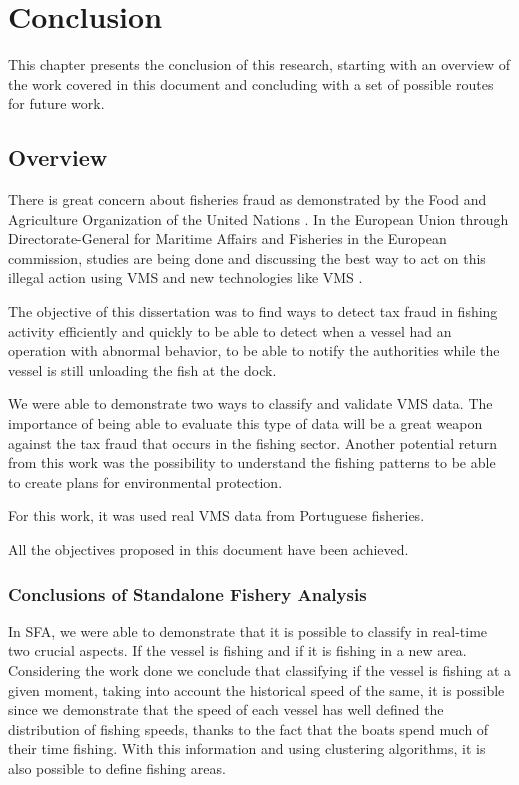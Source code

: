 % 
%  
%
\chapter{Conclusion}
\label{cha:conclusion}


This chapter presents the conclusion of this research, starting with an overview of the work covered in this document and concluding with a set of possible routes for future work.

\section{Overview} %
\label{sec:overview}

There is great concern about fisheries fraud as demonstrated by the Food and Agriculture Organization of the United Nations \cite{FAOFraud}.
In the European Union through Directorate-General for Maritime Affairs and Fisheries in the European commission, studies are being done and discussing the best way to act on this illegal action using VMS and new technologies like VMS \cite{WEBSITE:ECControl}.

The objective of this dissertation was to find ways to detect tax fraud in fishing activity efficiently and quickly to be able to detect when a vessel had an operation with abnormal behavior, to be able to notify the authorities while the vessel is still unloading the fish at the dock.

We were able to demonstrate two ways to classify and validate VMS data. The importance of being able to evaluate this type of data will be a great weapon against the tax fraud that occurs in the fishing sector. Another potential return from this work was the possibility to understand the fishing patterns to be able to create plans for environmental protection.

For this work, it was used real VMS data from Portuguese fisheries.

All the objectives proposed in this document have been achieved.

\subsection{Conclusions of Standalone Fishery Analysis} %
\label{sec:con_sfa}

In SFA, we were able to demonstrate that it is possible to classify in real-time two crucial aspects. If the vessel is fishing and if it is fishing in a new area.\\
Considering the work done we conclude that classifying if the vessel is fishing at a given moment, taking into account the historical speed of the same, it is possible since we demonstrate that the speed of each vessel has well defined the distribution of fishing speeds, thanks to the fact that the boats spend much of their time fishing.
With this information and using clustering algorithms, it is also possible to define fishing areas.\\

